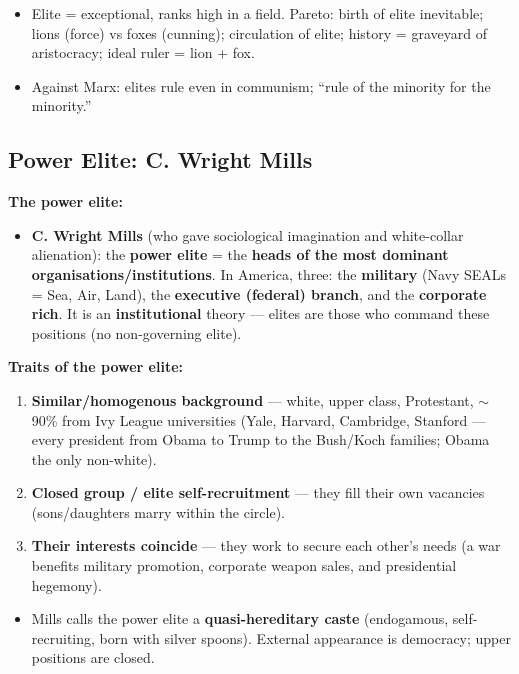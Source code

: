 \begin{QuickRevision}
\begin{itemize}
\item Elite = exceptional, ranks high in a field. Pareto: birth of elite inevitable; lions (force) vs foxes (cunning); circulation of elite; history = graveyard of aristocracy; ideal ruler = lion + fox.
\item Against Marx: elites rule even in communism; ``rule of the minority for the minority.''
\end{itemize}
\end{QuickRevision}

\sectiondivider

\subsection{Power Elite: C. Wright Mills}

\begin{KeyConcept}
\textbf{The power elite:}
\begin{itemize}
\item \textbf{C. Wright Mills} (who gave sociological imagination and white-collar alienation): the \textbf{power elite} = the \textbf{heads of the most dominant organisations/institutions}. In America, three: the \textbf{military} (Navy SEALs = Sea, Air, Land), the \textbf{executive (federal) branch}, and the \textbf{corporate rich}. It is an \textbf{institutional} theory --- elites are those who command these positions (no non-governing elite).
\end{itemize}
\end{KeyConcept}

\begin{DataFact}
\textbf{Traits of the power elite:}
\begin{enumerate}
\item \textbf{Similar/homogenous background} --- white, upper class, Protestant, $\sim$90\% from Ivy League universities (Yale, Harvard, Cambridge, Stanford --- every president from Obama to Trump to the Bush/Koch families; Obama the only non-white).
\item \textbf{Closed group / elite self-recruitment} --- they fill their own vacancies (sons/daughters marry within the circle).
\item \textbf{Their interests coincide} --- they work to secure each other's needs (a war benefits military promotion, corporate weapon sales, and presidential hegemony).
\end{enumerate}
\begin{itemize}
\item Mills calls the power elite a \textbf{quasi-hereditary caste} (endogamous, self-recruiting, born with silver spoons). External appearance is democracy; upper positions are closed.
\end{itemize}
\end{DataFact}

